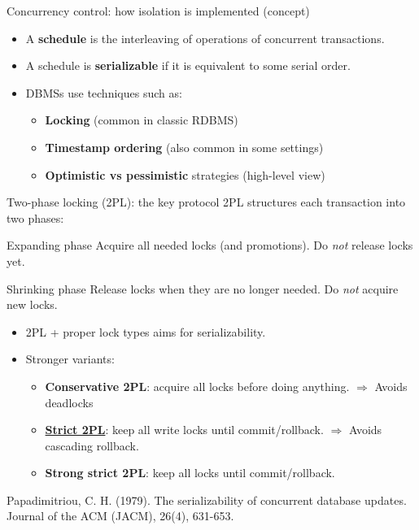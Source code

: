 \documentclass[10pt,aspectratio=169]{beamer}
\begin{document}
\begin{frame}{Concurrency control: how isolation is implemented (concept)}
\small
\begin{itemize}
  \item A \textbf{schedule} is the interleaving of operations of concurrent transactions.
  \item A schedule is \textbf{serializable} if it is equivalent to some serial order.
  \item DBMSs use techniques such as:
  \begin{itemize}
    \item \textbf{Locking} (common in classic RDBMS)
    \item \textbf{Timestamp ordering} (also common in some settings)
    \item \textbf{Optimistic vs pessimistic} strategies (high-level view)
  \end{itemize}
\end{itemize}
\end{frame}



\begin{frame}{Two-phase locking (2PL): the key protocol}
\small
2PL structures each transaction into two phases:
\vspace{1mm}
\begin{block}{Expanding phase}
Acquire all needed locks (and promotions). Do \emph{not} release locks yet.
\end{block}
\begin{block}{Shrinking phase}
Release locks when they are no longer needed. Do \emph{not} acquire new locks.
\end{block}

\vspace{1mm}
\begin{itemize}
  \item 2PL + proper lock types aims for serializability.
  \item Stronger variants:
  \begin{itemize}
    \item \textbf{Conservative 2PL}: acquire all locks before doing anything. $\Rightarrow$ Avoids deadlocks
    \item \textbf{\underline{Strict 2PL}}: keep all write locks until commit/rollback.
    $\Rightarrow$ Avoids cascading rollback.
    \item \textbf{Strong strict 2PL}: keep all locks until commit/rollback.
  \end{itemize}
\end{itemize}



Papadimitriou, C. H. (1979). The serializability of concurrent database updates. Journal of the ACM (JACM), 26(4), 631-653.

\end{frame}
\end{document}
